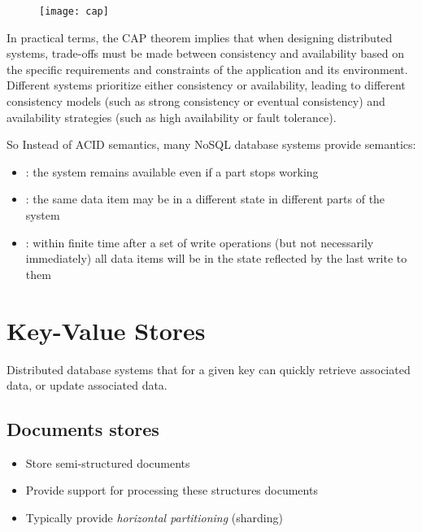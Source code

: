 \begin{figure}[H]
    \centering
    \texttt{[image: cap]}
\end{figure}

In practical terms, the CAP theorem implies that when designing distributed systems, trade-offs must be made between consistency and availability based on the specific requirements and constraints of the application and its environment. Different systems prioritize either consistency or availability, leading to different consistency models (such as strong consistency or eventual consistency) and availability strategies (such as high availability or fault tolerance).

So Instead of ACID semantics, many NoSQL database systems provide  semantics:

\begin{itemize}
    \item {} : the system remains available even if a part stops working
    \item {} : the same data item may be in a different state in different parts of the system
    \item {} : within finite time after a set of write operations (but not necessarily immediately) all data items will be in the state reflected by the last write to them
\end{itemize}

\section{Key-Value Stores}

Distributed database systems that for a given key can quickly retrieve associated data, or update associated data.

\subsection{Documents stores}

\begin{itemize}
    \item Store semi-structured documents
    \item Provide support for processing these structures documents
    \item Typically provide \textit{horizontal partitioning} (sharding)
\end{itemize}

